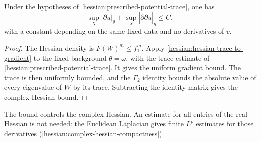 \begin{corollary}\label{hessian:prescribed-potential-complex-hessian}
Under the hypotheses of \cref{hessian:prescribed-potential-trace}, one has
\[
 \sup_X|\partial u|_g+\sup_X|\partial\bar\partial u|_g\leq C,
\]
with a constant depending on the same fixed data and no derivatives of $v$.
\end{corollary}
\begin{proof}
The Hessian density is $F(W)^m\leq f_1^m$. Apply \cref{hessian:hessian-trace-to-gradient} to the fixed background $\theta=\omega$, with the trace estimate of \cref{hessian:prescribed-potential-trace}. It gives the uniform gradient bound. The trace is then uniformly bounded, and the $\Gamma_2$ identity bounds the absolute value of every eigenvalue of $W$ by its trace. Subtracting the identity matrix gives the complex-Hessian bound.
\end{proof}

The bound controls the complex Hessian. An estimate for all entries of
the real Hessian is not needed: the Euclidean Laplacian gives finite
$L^p$ estimates for those derivatives
(\cref{hessian:complex-hessian-compactness}).
